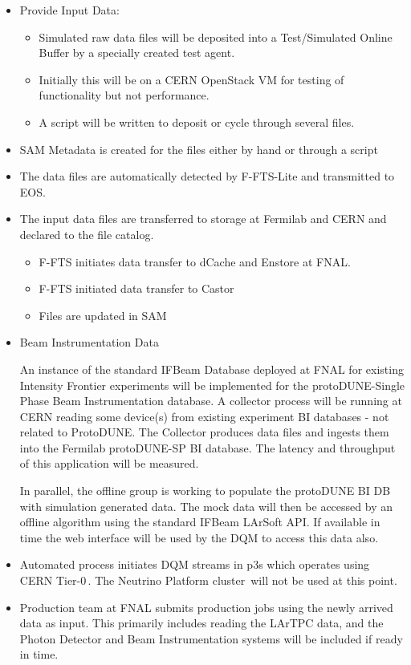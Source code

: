\documentclass[pdftex,12pt,letter]{article}
\begin{document}
\begin{itemize}

\item Provide Input Data: 
\begin{itemize}
\item Simulated raw data files will be deposited into a Test/Simulated Online Buffer by a specially created test agent.
\item  Initially this will be on a CERN OpenStack VM for testing of functionality but not performance. 
\item A script will be written to deposit or cycle through several files. 
\end{itemize}
\item SAM Metadata is created for the files either by hand or through a script

\item The data files are automatically detected by F-FTS-Lite and transmitted to EOS.

\item The input data files are transferred to storage at Fermilab and CERN and declared to the file catalog.
\begin{itemize}
\item F-FTS initiates data transfer to dCache and Enstore at FNAL. 
\item F-FTS initiated data transfer to Castor
\item Files are updated in SAM
\end{itemize}

\item  Beam Instrumentation Data

An  instance of the standard IFBeam Database deployed at FNAL for existing Intensity Frontier experiments will be implemented for the protoDUNE-Single Phase Beam Instrumentation database.  A collector process will be running at CERN  reading some device(s) from existing experiment BI databases -  not related to ProtoDUNE.  The Collector produces data files and ingests them into the Fermilab protoDUNE-SP BI database. The latency and throughput of this application will be measured.

In parallel, the offline group is working to populate the  protoDUNE BI DB with simulation generated data. The mock data will then be accessed by an offline algorithm using the standard IFBeam LArSoft API.  If available in time the web interface will be used by the DQM to access this data also. 

\item Automated process initiates DQM streams in p3s which operates using
CERN Tier-0\,\cite{lxbatch}. The Neutrino Platform cluster\,\cite{neut} will not be used at this point.

\item Production team at FNAL submits production jobs using the newly arrived data as input.
This primarily includes reading the LArTPC data, and the Photon Detector and Beam Instrumentation
systems will be included if ready in time.

\end{itemize}
\end{document}

